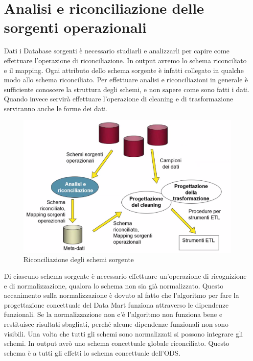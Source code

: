 
\section{Analisi e riconciliazione delle sorgenti operazionali}
Dati i Database sorgenti è necessario studiarli e analizzarli per capire come effettuare l'operazione di riconciliazione.\newline
In output avremo lo schema riconciliato e il mapping.
Ogni attributo dello schema sorgente è infatti collegato in qualche modo allo schema riconciliato.\newline
Per effettuare analisi e riconciliazioni in generale è sufficiente conoscere la struttura degli schemi, e non sapere come sono fatti i dati.\newline
Quando invece servirà effettuare l'operazione di cleaning e di trasformazione serviranno anche le forme dei dati.
\begin{figure}[H]
	\begin{center}
		\includegraphics[width=0.6\linewidth]{img/riconciliato.PNG}
		\caption{Riconciliazione degli schemi sorgente}
	\end{center}
\end{figure}
\noindent Di ciascuno schema sorgente è necessario effettuare un'operazione di ricognizione e di normalizzazione, qualora lo schema non sia già normalizzato. Questo accanimento sulla normalizzazione è dovuto al fatto che l'algoritmo per fare la progettazione concettuale del Data Mart funziona attraverso le dipendenze funzionali. Se la normalizzazione non c'è l'algoritmo non funziona bene e restituisce risultati sbagliati, perché alcune dipendenze funzionali non sono visibili.\newline
Una volta che tutti gli schemi sono normalizzati si possono integrare gli schemi. In output avrò uno schema concettuale globale riconciliato. Questo schema è a tutti gli effetti lo schema concettuale dell'ODS.\newline
